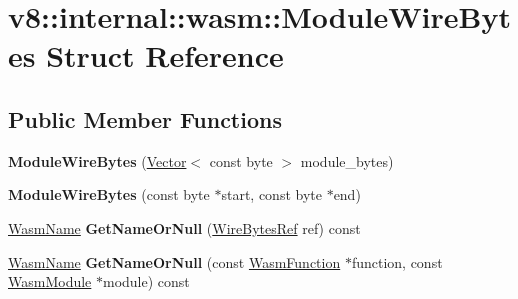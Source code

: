 \hypertarget{structv8_1_1internal_1_1wasm_1_1ModuleWireBytes}{}\section{v8\+:\+:internal\+:\+:wasm\+:\+:Module\+Wire\+Bytes Struct Reference}
\label{structv8_1_1internal_1_1wasm_1_1ModuleWireBytes}
\subsection*{Public Member Functions}
\begin{DoxyCompactItemize}
\item 
\mbox{\label{structv8_1_1internal_1_1wasm_1_1ModuleWireBytes_a3bc17e8e659fadd87f0f516a00bb173a}} 
{\bfseries Module\+Wire\+Bytes} (\mbox{\hyperlink{classv8_1_1internal_1_1Vector}{Vector}}$<$ const byte $>$ module\+\_\+bytes)
\item 
\mbox{\label{structv8_1_1internal_1_1wasm_1_1ModuleWireBytes_ab3ef90c14046d8a0fe70dc1f204f5cb9}} 
{\bfseries Module\+Wire\+Bytes} (const byte $\ast$start, const byte $\ast$end)
\item 
\mbox{\label{structv8_1_1internal_1_1wasm_1_1ModuleWireBytes_aad25d74a24c1f21b337f94460ecc662c}} 
\mbox{\hyperlink{classv8_1_1internal_1_1Vector}{Wasm\+Name}} {\bfseries Get\+Name\+Or\+Null} (\mbox{\hyperlink{classv8_1_1internal_1_1wasm_1_1WireBytesRef}{Wire\+Bytes\+Ref}} ref) const
\item 
\mbox{\label{structv8_1_1internal_1_1wasm_1_1ModuleWireBytes_af6eed3b01da7e550f48d929cf8742eb7}} 
\mbox{\hyperlink{classv8_1_1internal_1_1Vector}{Wasm\+Name}} {\bfseries Get\+Name\+Or\+Null} (const \mbox{\hyperlink{structv8_1_1internal_1_1wasm_1_1WasmFunction}{Wasm\+Function}} $\ast$function, const \mbox{\hyperlink{structv8_1_1internal_1_1wasm_1_1WasmModule}{Wasm\+Module}} $\ast$module) const
\item 
\mbox{\label{structv8_1_1internal_1_1wasm_1_1ModuleWireBytes_a9156fb9f7ed4727d751b7db0a5bce206}} 

\end{DoxyCompactItemize}
